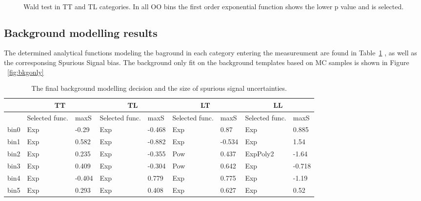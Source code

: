\begin{figure}[htbp]
   \\
  \caption{Wald test in TT and TL categories. In all OO bins the first order exponential function shows the lower p value and is selected.}
  \label{fig:Wtest}
\end{figure}




\subsection{Background modelling results}
\label{ssec:bck_results}

The determined analytical functions modeling the baground in each category entering the measureument are found in Table~\ref{tab:spurious_sig} , as well as the corresponsing Spurious Signal bias.
The background only fit on the background templates based on MC samples is shown in Figure ~\ref{fig:bkgonly}


\begin{table}[htbp]
\centering
\small
\begin{tabular}{l|l|l|l|l|l|l|l|l}
\hline
           & \multicolumn{2}{c|}{TT} & \multicolumn{2}{c|}{TL} & \multicolumn{2}{c|}{LT} & \multicolumn{2}{c|}{LL} \\ \hline
           & Selected func. & maxS   & Selected func. & maxS   & Selected func. & maxS   & Selected func. & maxS   \\ \hline \hline
bin0       & Exp            & -0.29  & Exp            & -0.468 & Exp            & 0.87   & Exp            & 0.885  \\ \hline
bin1       & Exp            & 0.582  & Exp            & -0.882 & Exp            & -0.534 & Exp            & 1.54   \\ \hline
bin2       & Exp            & 0.235  & Exp            & -0.355 & Pow            & 0.437  & ExpPoly2       & -1.64  \\ \hline
bin3       & Exp            & 0.409  & Exp            & -0.304 & Pow            & 0.642  & Exp            & -0.718 \\ \hline
bin4       & Exp            & -0.404 & Exp            & 0.779  & Exp            & 0.775  & Exp            & -1.19  \\ \hline
bin5       & Exp            & 0.293  & Exp            & 0.408  & Exp            & 0.627  & Exp            & 0.52   \\ \hline
\end{tabular}
\caption{The final background modelling decision and the size of spurious signal uncertainties.}
\label{tab:spurious_sig}
\end{table}


